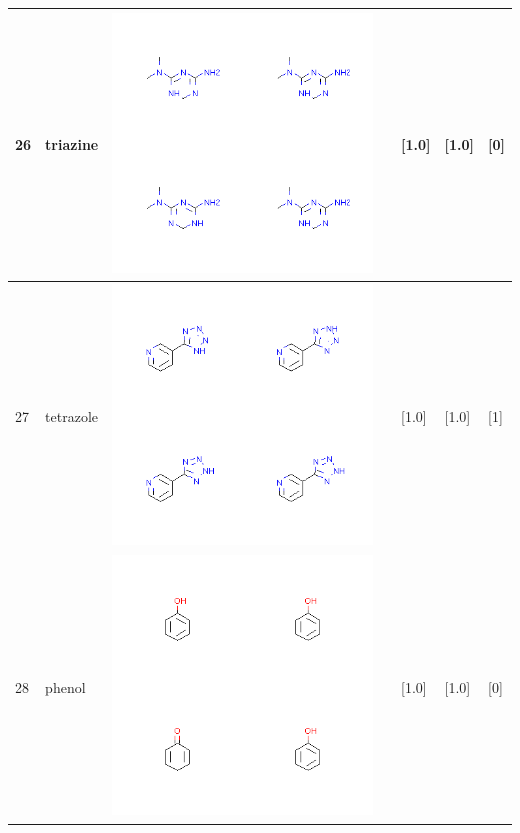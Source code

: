 \begin{longtable}{|l|l|l|l|l|l|l|}
\hline
26 & triazine & \includegraphics[scale=0.6]{triazineMV.png} & & [1.0]& [1.0] & [0] \\
\hline
27 & tetrazole & \includegraphics[scale=0.6]{tetrazoleMV.png} & & [1.0]& [1.0] & [1] \\
\hline
28 & phenol & \includegraphics[scale=0.6]{phenolMV.png} & & [1.0]& [1.0] & [0] \\

\end{longtable}
